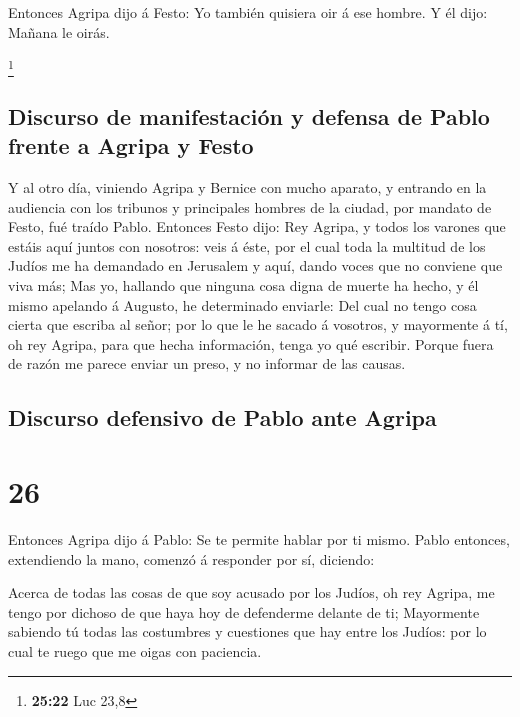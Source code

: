  Entonces Agripa dijo á Festo: Yo también quisiera oir á
ese hombre. Y él dijo: Mañana le oirás.

\footnote{\textbf{25:22} Luc 23,8}

\hypertarget{discurso-de-manifestaciuxf3n-y-defensa-de-pablo-frente-a-agripa-y-festo}{%
\subsection{Discurso de manifestación y defensa de Pablo frente a Agripa
y
Festo}\label{discurso-de-manifestaciuxf3n-y-defensa-de-pablo-frente-a-agripa-y-festo}}

 Y al otro día, viniendo Agripa y Bernice con mucho
aparato, y entrando en la audiencia con los tribunos y principales
hombres de la ciudad, por mandato de Festo, fué traído Pablo.
 Entonces Festo dijo: Rey Agripa, y todos los varones que
estáis aquí juntos con nosotros: veis á éste, por el cual toda la
multitud de los Judíos me ha demandado en Jerusalem y aquí, dando voces
que no conviene que viva más;  Mas yo, hallando que ninguna
cosa digna de muerte ha hecho, y él mismo apelando á Augusto, he
determinado enviarle:  Del cual no tengo cosa cierta que
escriba al señor; por lo que le he sacado á vosotros, y mayormente á tí,
oh rey Agripa, para que hecha información, tenga yo qué escribir.
 Porque fuera de razón me parece enviar un preso, y no
informar de las causas.

\hypertarget{discurso-defensivo-de-pablo-ante-agripa}{%
\subsection{Discurso defensivo de Pablo ante
Agripa}\label{discurso-defensivo-de-pablo-ante-agripa}}

\hypertarget{section-25}{%
\section{26}\label{section-25}}

 Entonces Agripa dijo á Pablo: Se te permite hablar por ti
mismo. Pablo entonces, extendiendo la mano, comenzó á responder por sí,
diciendo:

 Acerca de todas las cosas de que soy acusado por los
Judíos, oh rey Agripa, me tengo por dichoso de que haya hoy de
defenderme delante de ti;  Mayormente sabiendo tú todas las
costumbres y cuestiones que hay entre los Judíos: por lo cual te ruego
que me oigas con paciencia.

